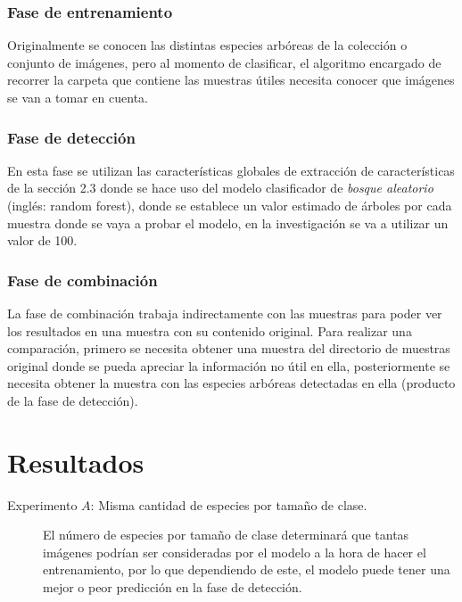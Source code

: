 \documentclass[a0,portrait]{a0poster}
\begin{document}
\begin{multicols}{2}
\subsubsection*{Fase de entrenamiento}
Originalmente se conocen las distintas especies arbóreas de la colección o conjunto de imágenes, pero al momento de clasificar, el algoritmo encargado de recorrer la carpeta que contiene las muestras útiles  necesita conocer que imágenes se van a tomar en cuenta. 

\subsubsection*{Fase de detección}
 En esta fase se utilizan las características globales de extracción de características de la sección 2.3 donde se hace uso del modelo clasificador de {\em bosque aleatorio} (inglés: random forest)\footnotemark, donde se establece un valor estimado de árboles por cada muestra donde se vaya a probar el modelo, en la investigación se va a utilizar un valor de 100.  

\subsubsection*{Fase de combinación}
La fase de combinación trabaja indirectamente con las muestras para poder ver los resultados en una muestra con su contenido original. Para realizar una comparación, primero se necesita obtener una muestra del directorio de muestras original donde se pueda apreciar la información no útil en ella, posteriormente se necesita obtener la muestra con las especies arbóreas detectadas en ella (producto de la fase de detección).\\ 


\vspace*{-25mm}
\section*{Resultados}
\begin{description}
\item[Experimento $A$: Misma cantidad de especies por tamaño de clase.]{El número de especies por tamaño de clase determinará que tantas imágenes podrían ser consideradas por el modelo a la hora de hacer el entrenamiento, por lo que dependiendo de este, el modelo puede tener una mejor o peor predicción en la fase de detección.}


\end{description}
\end{multicols}
\end{document}
